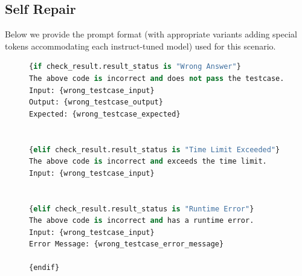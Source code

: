     
\subsection{Self Repair}
\label{appendix:repair-prompts}
Below we provide the prompt format (with appropriate variants adding special tokens accommodating each instruct-tuned model) used for this scenario.

\begin{figure}[h!]
\centering
\begin{tcolorbox}[enhanced,size=small,colback=black!5!white,colframe=RoyalBlue,flip title={interior hidden},title={Self Repair Error Feedback Pseudocode}]
\begin{lstlisting}[label={lst:execution-example-filtered-1}, captionpos=b, breaklines=true, language=Python]
{if check_result.result_status is "Wrong Answer"}
The above code is incorrect and does not pass the testcase.
Input: {wrong_testcase_input}
Output: {wrong_testcase_output}
Expected: {wrong_testcase_expected}


{elif check_result.result_status is "Time Limit Exceeded"}
The above code is incorrect and exceeds the time limit.
Input: {wrong_testcase_input}


{elif check_result.result_status is "Runtime Error"}
The above code is incorrect and has a runtime error.
Input: {wrong_testcase_input}
Error Message: {wrong_testcase_error_message}

{endif}
\end{lstlisting}
\end{tcolorbox}
\end{figure}

